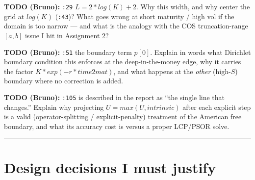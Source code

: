 \documentclass[
  11pt,
]{article}
\begin{document}
\textbf{TODO (Bruno):} \texttt{:29} \(L = 2*log(K) + 2\). Why this
width, and why center the grid at \(log(K)\) (\texttt{:43})? What goes
wrong at short maturity / high vol if the domain is too narrow --- and
what is the analogy with the COS truncation-range \([a,b]\) issue I hit
in Assignment 2?

\textbf{TODO (Bruno):} \texttt{:51} the boundary term \(p[0]\). Explain
in words what Dirichlet boundary condition this enforces at the
deep-in-the-money edge, why it carries the factor
\(K*exp(-r*time2mat)\), and what happens at the \emph{other}
(high-\(S\)) boundary where no correction is added.

\textbf{TODO (Bruno):} \texttt{:105} is described in the report as ``the
single line that changes.'' Explain why projecting
\(U = max(U, intrinsic)\) after each explicit step is a valid
(operator-splitting / explicit-penalty) treatment of the American free
boundary, and what its accuracy cost is versus a proper LCP/PSOR solve.

\begin{center}\rule{0.5\linewidth}{0.5pt}\end{center}

\hypertarget{design-decisions-i-must-justify}{%
\section{Design decisions I must
justify}\label{design-decisions-i-must-justify}}
\end{document}
